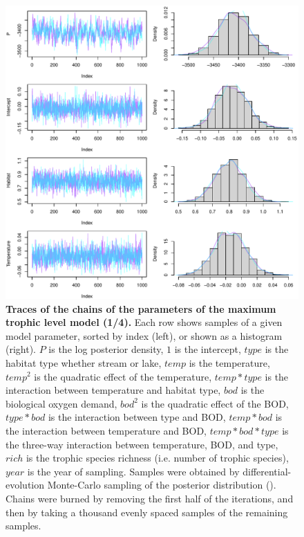 \documentclass[11pt, oneside]{article}
\begin{document}
\begin{figure}[H]
\begin{center}
\includegraphics[page=1, width=1\linewidth]{b0_6_3/out_mTL/fig_tracePlot_beta.pdf}
\caption{
    \textbf{Traces of the chains of the parameters of the maximum trophic level model (1/4).}
    Each row shows samples of a given model parameter, sorted by index (left), or shown as a histogram (right).
    $P$ is the log posterior density, $1$ is the intercept, $type$ is the habitat type whether stream or lake, $temp$ is the temperature, $temp^2$ is the quadratic effect of the temperature, $temp * type$ is the interaction between temperature and habitat type, $bod$ is the biological oxygen demand, $bod^2$ is the quadratic effect of the BOD, $type * bod$ is the interaction between type and BOD, $temp * bod$ is the interaction between temperature and BOD, $temp * bod * type$ is the three-way interaction between temperature, BOD, and type, $rich$ is the trophic species richness (i.e. number of trophic species), $year$ is the year of sampling.
    Samples were obtained by differential-evolution Monte-Carlo sampling of the posterior distribution (\cite{TerBraak2006}).
    Chains were burned by removing the first half of the iterations, and then by taking a thousand evenly spaced samples of the remaining samples.
} 
\end{center}
\end{figure}
\end{document}
